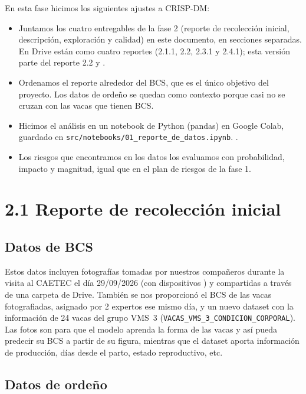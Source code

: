 \documentclass[11pt,letterpaper,DIV=12]{scrartcl}
\begin{document}
En esta fase hicimos los siguientes ajustes a CRISP-DM:
\begin{itemize}
  \item Juntamos los cuatro entregables de la fase 2 (reporte de recolección inicial, descripción, exploración y calidad) en este documento, en secciones separadas. En Drive están como cuatro reportes (2.1.1, 2.2, 2.3.1 y 2.4.1); esta versión parte del reporte 2.2 y .
  \item Ordenamos el reporte alrededor del BCS, que es el único objetivo del proyecto. Los datos de ordeño se quedan como contexto porque casi no se cruzan con las vacas que tienen BCS.
  \item Hicimos el análisis en un notebook de Python (pandas) en Google Colab, guardado en \texttt{src/notebooks/01\_reporte\_de\_datos.ipynb}. .
  \item Los riesgos que encontramos en los datos los evaluamos con probabilidad, impacto y magnitud, igual que en el plan de riesgos de la fase 1.
\end{itemize}

\section{2.1 Reporte de recolección inicial}

\subsection{Datos de BCS}

Estos datos incluyen fotografías tomadas por nuestros compañeros durante la visita al CAETEC el día 29/09/2026 (con dispositivos ) y compartidas a través de una carpeta de Drive. También se nos proporcionó el BCS de las vacas fotografiadas, asignado por 2 expertos ese mismo día, y un nuevo dataset con la información de 24 vacas del grupo VMS~3 (\texttt{VACAS\_VMS\_3\_CONDICION\_CORPORAL}). Las fotos son para que el modelo aprenda la forma de las vacas y así pueda predecir su BCS a partir de su figura, mientras que el dataset aporta información de producción, días desde el parto, estado reproductivo, etc.

\subsection{Datos de ordeño}
\end{document}
